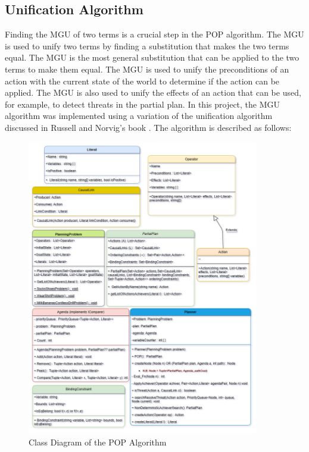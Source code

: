 \subsection{Unification Algorithm} \label{subsec:unification_algorithm}
Finding the \acf{MGU} of two terms is a crucial step in the \ac{POP} algorithm. The \ac{MGU} is used to unify two terms by finding a substitution that makes the two terms equal. The \ac{MGU} is the most general substitution that can be applied to the two terms to make them equal. The \ac{MGU} is used to unify the preconditions of an action with the current state of the world to determine if the action can be applied. The \ac{MGU} is also used to unify the effects of an action that can be used, for example, to detect threats in the partial plan. In this project, the \ac{MGU} algorithm was implemented using a variation of the unification algorithm discussed in Russell and Norvig's book \cite{RN2020_Ch.9}.
The algorithm is described as follows:



\begin{figure}[ht]
    \centering
    \includegraphics[width=0.9\textwidth]{images/POP.png}
    \caption[Class Diagram of the POP Algorithm]{Class Diagram of the POP Algorithm}
    \label{fig:pop}
\end{figure}
